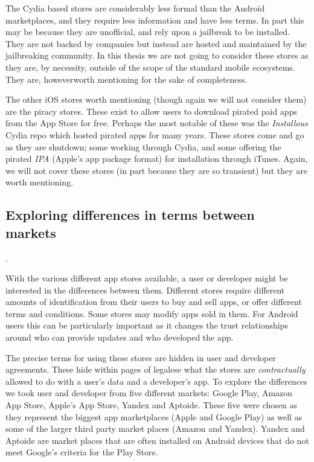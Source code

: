 \documentclass[thesis.tex]{subfiles}
\begin{document}
The Cydia based stores are considerably less formal than the Android marketplaces, and they require less information and have less terms.
In part this may be because they are unofficial, and rely upon a jailbreak to be installed.  They are not backed by companies but instead are hosted and maintained by the jailbreaking community.  In this thesis we are not going to consider these stores as they are, by necessity, outside of the scope of the standard mobile ecosystems.  They are, howeverworth mentioning for the sake of completeness.

The other iOS stores worth mentioning (though again we will not consider them) are the piracy stores.
These exist to allow users to download pirated paid apps from the App Store for free.
Perhaps the most notable of these was the \emph{Installous} Cydia repo which hosted pirated apps for many years.
These stores come and go as they are shutdown; some working through Cydia, and some offering the pirated \emph{IPA} (Apple's app package format) for installation through iTunes.
Again, we will not cover these stores (in part because they are so transient) but they are worth mentioning.

\subsection{Exploring differences in terms between markets}.

With the various different app stores available, a user or developer might be interested in the differences between them.
Different stores require different amounts of identification from their users to buy and sell apps, or offer different terms and conditions.
Some stores may modify apps sold in them.  For Android users this can be particularly important as it changes the trust relationships around who can provide updates and who developed the app.

The precise terms for using these stores are hidden in user and developer agreements.
These hide within pages of legalese what the stores are \emph{contractually} allowed to do with a user's data and a developer's app.
To explore the differences we took user and developer from five different markets: Google Play, Amazon App Store, Apple's App Store, Yandex and Aptoide.
These five were chosen as they represent the biggest app marketplaces (Apple and Google Play) as well as some of the larger third party market places (Amazon and Yandex).
Yandex and Aptoide are market places that are often installed on Android devices that do not meet Google's criteria for the Play Store.
\end{document}

